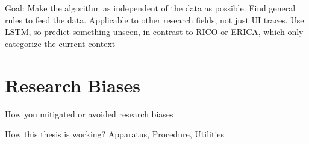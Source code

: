 Goal: Make the algorithm as independent of the data as possible.
Find general rules to feed the data.
Applicable to other research fields, not just UI traces.
Use LSTM, so predict something unseen, in contrast to RICO or ERICA, which only categorize the current context


\section{Research Biases}
How you mitigated or avoided research biases

How this thesis is working?
Apparatus, Procedure, Utilities
